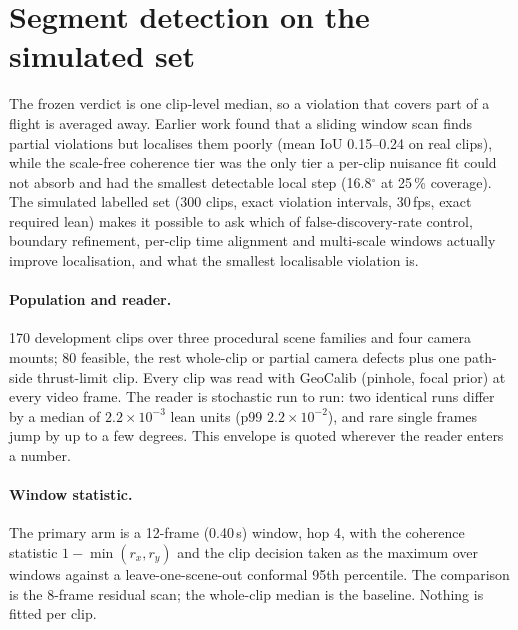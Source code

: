 \section{Segment detection on the simulated set}
\label{sec:g3-segments}

The frozen verdict is one clip-level median, so a violation that covers part of a flight is
averaged away. Earlier work found that a sliding window scan finds partial violations but
localises them poorly (mean IoU 0.15--0.24 on real clips), while the scale-free coherence tier
was the only tier a per-clip nuisance fit could not absorb and had the smallest detectable local
step (16.8$^\circ$ at 25\,\% coverage). The simulated labelled set (300 clips, exact violation
intervals, 30\,fps, exact required lean) makes it possible to ask which of false-discovery-rate
control, boundary refinement, per-clip time alignment and multi-scale windows actually improve
localisation, and what the smallest localisable violation is.

\paragraph{Population and reader.}
170 development clips over three procedural scene families and four camera mounts; 80 feasible,
the rest whole-clip or partial camera defects plus one path-side thrust-limit clip. Every clip
was read with GeoCalib (pinhole, focal prior) at every video frame. The reader is stochastic run
to run: two identical runs differ by a median of $2.2\times10^{-3}$ lean units (p99
$2.2\times10^{-2}$), and rare single frames jump by up to a few degrees. This envelope is quoted
wherever the reader enters a number.

\paragraph{Window statistic.}
The primary arm is a 12-frame (0.40\,s) window, hop 4, with the coherence statistic
$1-\min(r_x,r_y)$ and the clip decision taken as the maximum over windows against a
leave-one-scene-out conformal 95th percentile. The comparison is the 8-frame residual scan; the
whole-clip median is the baseline. Nothing is fitted per clip.

